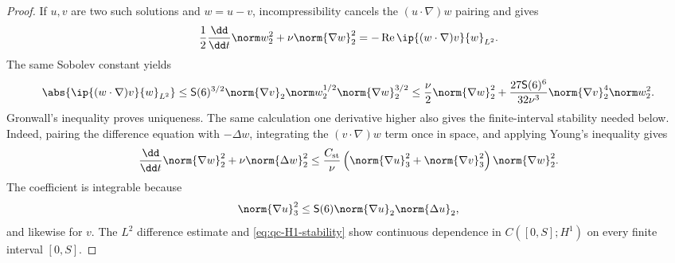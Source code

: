 \begin{proof}
If \(u,v\) are two such solutions and \(w=u-v\), incompressibility cancels
the \((u\cdot\nabla)w\) pairing and gives
\[
 \frac12\frac{\dd}{\dd t}\norm w_2^2
 +\nu\norm{\nabla w}_2^2
 =-\operatorname{Re}\ip{(w\cdot\nabla)v}{w}_{L^2}.
\]
The same Sobolev constant yields
\[
 \abs{\ip{(w\cdot\nabla)v}{w}_{L^2}}
 \le \mathsf S(6)^{3/2}\norm{\nabla v}_2
       \norm w_2^{1/2}\norm{\nabla w}_2^{3/2}
 \le\frac\nu2\norm{\nabla w}_2^2
 +\frac{27\mathsf S(6)^6}{32\nu^3}
  \norm{\nabla v}_2^4\norm w_2^2.
\]
Gronwall's inequality proves uniqueness.  The same calculation one derivative
higher also gives the finite-interval stability needed below.  Indeed, pairing
the difference equation with \(-\Delta w\), integrating the
\((v\cdot\nabla)w\) term once in space, and applying Young's inequality gives
\begin{equation}
 \frac{\dd}{\dd t}\norm{\nabla w}_2^2
 +\nu\norm{\Delta w}_2^2
 \le \frac{C_{\rm st}}\nu
 \left(\norm{\nabla u}_3^2+\norm{\nabla v}_3^2\right)
 \norm{\nabla w}_2^2.
 \label{eq:qc-H1-stability}
\end{equation}
The coefficient is integrable because
\[
 \norm{\nabla u}_3^2
 \le \mathsf S(6)\norm{\nabla u}_2\norm{\Delta u}_2,
\]
and likewise for \(v\).  The \(L^2\) difference estimate and
\eqref{eq:qc-H1-stability} show continuous dependence in
\(C([0,S];H^1)\) on every finite interval \([0,S]\).


\end{proof}
